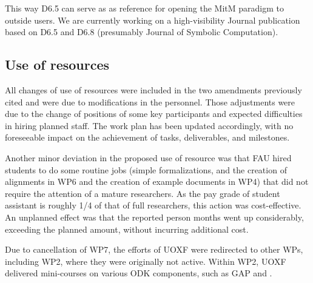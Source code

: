 This way D6.5 can serve as as reference for opening the MitM paradigm to outside users. We
are currently working on a high-visibility Journal publication based on D6.5 and D6.8
(presumably Journal of Symbolic Computation). 

\subsection{Use of resources}

All changes of use of resources were included in the two amendments previously cited and were
due to modifications in the personnel. Those adjustments were due to the change of positions
of some key \ODK participants and expected difficulties in hiring planned
staff. The work plan has been updated accordingly, with no foreseeable
impact on the achievement of tasks, deliverables, and milestones.

Another minor deviation in the proposed use of resource was that FAU hired students to do
some routine jobs (simple formalizations, and the creation of alignments in WP6 and the
creation of example documents in WP4) that did not require the attention of a mature
researchers. As the pay grade of student assistant is roughly 1/4 of that of full
researchers, this action was cost-effective. An unplanned effect was that the reported
person months went up considerably, exceeding the planned amount, without incurring
additional cost. 

Due to cancellation of WP7, the efforts of UOXF were redirected to other WPs, including
WP2, where they were originally not active. Within WP2, UOXF delivered mini-courses on various ODK components,
such as GAP and \Sage.

